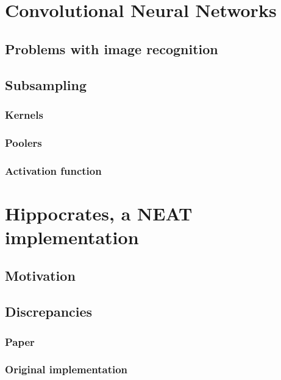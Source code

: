 \documentclass[11pt]{article}
\begin{document}
	\section{Convolutional Neural Networks}
		\subsection{Problems with image recognition}
			
		\subsection{Subsampling}
			
			\subsubsection{Kernels}
			
			\subsubsection{Poolers}
			
			\subsubsection{Activation function}
			
	\newpage

	\section{Hippocrates, a NEAT implementation}
		\subsection{Motivation}
			
		\subsection{Discrepancies}
			\subsubsection{Paper}
				
			\subsubsection{Original implementation}
				
\end{document}
